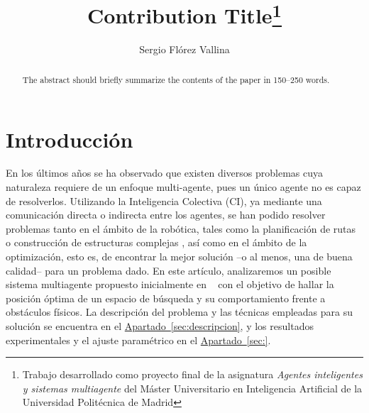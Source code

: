 \documentclass[runningheads]{llncs}
\newcommand{\refcruzada}[2]{\hyperref[#2]{#1~\ref{#2}}}
\begin{document}
    \title{Contribution Title\thanks{Trabajo desarrollado como proyecto final de la asignatura \textit{Agentes inteligentes y sistemas multiagente} del Máster Universitario en Inteligencia Artificial de la Universidad Politécnica de Madrid}}
    \author{Sergio Flórez Vallina}

    \maketitle              %
    \begin{abstract}
        The abstract should briefly summarize the contents of the paper in
        150--250 words.

    \end{abstract}

    \section{Introducción}
    En los últimos años se ha observado que existen diversos problemas cuya naturaleza requiere de un enfoque multi-agente, pues un único agente no es capaz de resolverlos.
    Utilizando la Inteligencia Colectiva (CI), ya mediante una comunicación directa o indirecta entre los agentes, se han podido resolver problemas tanto en el ámbito de la robótica, tales como la planificación de rutas o construcción de estructuras complejas \cite{collectiveConstruction}, así como en el ámbito de la optimización, esto es, de encontrar la mejor solución --o al menos, una de buena calidad-- para un problema dado.
    En este artículo, analizaremos un posible sistema multiagente propuesto inicialmente en ~\cite{initialPaper}  con el objetivo de hallar la posición óptima de un espacio de búsqueda y su comportamiento frente a obstáculos físicos.
    La descripción del problema y las técnicas empleadas para su solución se encuentra en el \refcruzada{Apartado}{sec:descripcion}, y los resultados experimentales y el ajuste paramétrico en el \refcruzada{Apartado}{sec:}. %
\end{document}
